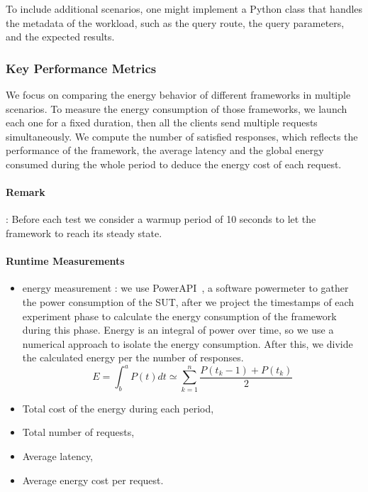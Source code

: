 To include additional scenarios, one might implement a Python class that handles the metadata of the workload, such as the query route, the query parameters, and the expected results.
\subsubsection{Key Performance Metrics}
We focus on comparing the energy behavior of different frameworks in multiple scenarios.
To measure the energy consumption of those frameworks, we launch each one for a fixed duration, then all the clients send multiple requests simultaneously.
We compute the number of satisfied responses, which reflects the performance of the framework, the average latency and the global energy consumed during the whole period to deduce the energy cost of each request.

\paragraph{Remark}:
Before each test we consider a warmup period of 10 seconds to let the framework to reach its steady state.

\paragraph{Runtime Measurements}
\begin{itemize}
    \item energy measurement :
          we use PowerAPI~\cite{bourdon:hal-00772454}, a software powermeter to gather the power consumption of the SUT, after we project the timestamps of each experiment phase to calculate the energy consumption of the framework during this phase.
          Energy is an integral of power over time, so we use a numerical approach to isolate the energy consumption.%
          After this, we divide the calculated energy per the number of responses.
          \begin{equation}
              E = \int^a_b P(t)dt \simeq \sum^n_{k=1} \frac{P(t_k-1)+P(t_k)}{2}
          \end{equation}
    \item Total cost of the energy during each period,
    \item Total number of requests,
    \item Average latency,
    \item Average energy cost per request.
\end{itemize}

